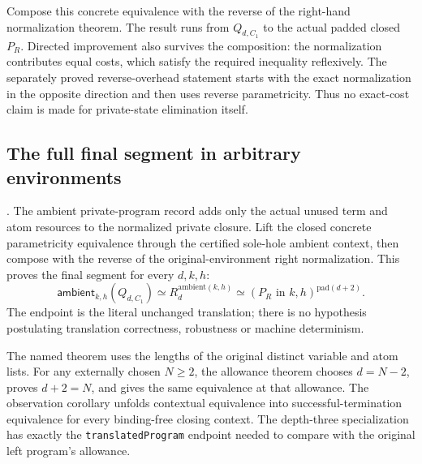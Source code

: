 Compose this concrete equivalence with the reverse of the right-hand
normalization theorem. The result runs from $Q_{d,C_1}$ to the actual
padded closed $P_R$. Directed improvement also survives the composition:
the normalization contributes equal costs, which satisfy the required
inequality reflexively. The separately proved reverse-overhead statement
starts with the exact normalization in the opposite direction and then
uses reverse parametricity. Thus no exact-cost claim is made for private-state
elimination itself.

\subsection{The full final segment in arbitrary environments}
.
The ambient private-program record adds only the actual unused term and
atom resources to the normalized private closure. Lift the closed concrete
parametricity equivalence through the certified sole-hole ambient context,
then compose with the reverse of the original-environment right normalization.
This proves the final segment for every $d,k,h$:
\[
 \mathsf{ambient}_{k,h}(Q_{d,C_1})
 \simeq R_d^{\mathrm{ambient}(k,h)}
 \simeq (P_R\text{ in }k,h)^{\mathrm{pad}(d+2)}.
\]
The endpoint is the literal unchanged translation; there is no hypothesis
postulating translation correctness, robustness or machine determinism.

The named theorem uses the lengths of the original distinct variable and
atom lists. For any externally chosen $N\geq2$, the allowance theorem
chooses $d=N-2$, proves $d+2=N$, and gives the same equivalence at that
allowance. The observation corollary unfolds contextual equivalence into
successful-termination equivalence for every binding-free closing context.
The depth-three specialization has exactly the \texttt{translatedProgram}
endpoint needed to compare with the original left program's allowance.

